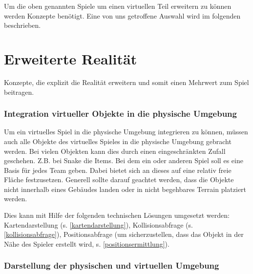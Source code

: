 Um die oben genannten Spiele um einen virtuellen Teil erweitern zu können werden Konzepte benötigt. Eine von uns getroffene Auswahl wird im folgenden beschrieben. 

\section{Erweiterte Realität}
Konzepte, die explizit die Realität erweitern und somit einen Mehrwert zum Spiel beitragen.


\subsubsection{Integration virtueller Objekte in die physische Umgebung}
Um ein virtuelles Spiel in die physische Umgebung integrieren zu können, müssen auch alle Objekte
des virtuelles Spieles in die physische Umgebung gebracht werden.
Bei vielen Objekten kann dies durch einen eingeschränkten Zufall geschehen. Z.B. bei Snake die 
Items. Bei dem ein oder anderen Spiel soll es eine Basis für jedes Team geben. Dabei bietet sich an
dieses auf eine relativ freie Fläche festzusetzen. Generell sollte darauf geachtet werden, 
dass die Objekte nicht innerhalb eines Gebäudes landen oder in nicht begehbares Terrain platziert werden.



Dies kann mit Hilfe der folgenden technischen Lösungen umgesetzt werden:
Kartendarstellung (s. \ref{kartendarstellung}), Kollisionsabfrage (s. \ref{kollisionsabfrage}), Positionsabfrage (um sicherzustellen, dass das Objekt in der Nähe des Spieler erstellt wird, s. \ref{positionsermittlung}).

\subsubsection{Darstellung der physischen und virtuellen Umgebung}

